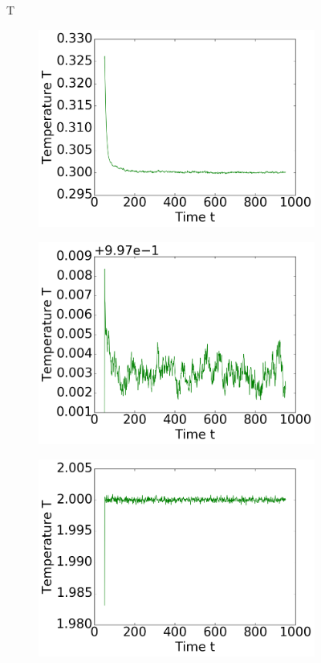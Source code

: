 \begin{figure}[ht]
T
\hfill
\begin{subfigure}{0.3\textwidth}
\includegraphics[width=\textwidth]{../dat/avTemperature_T0d3_M100.png}
\end{subfigure}
\hfill
\begin{subfigure}{0.3\textwidth}
\includegraphics[width=\textwidth]{../dat/avTemperature_T1d0_M100.png}
\end{subfigure}
\hfill
\begin{subfigure}{0.3\textwidth}
\includegraphics[width=\textwidth]{../dat/avTemperature_T2d0_M100.png}
\end{subfigure}


\end{figure}
